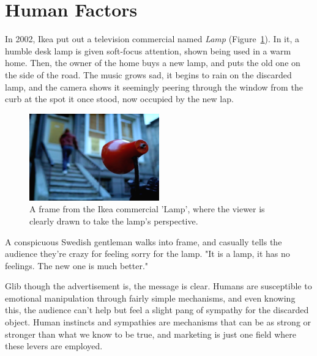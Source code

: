 \documentclass{sfuthesis}
\begin{document}









\section{Human Factors}

In 2002, Ikea put out a television commercial named \textit{Lamp} (Figure~\ref{fig:lamp}). In it, a humble desk lamp is given soft-focus attention, shown being used in a warm home. Then, the owner of the home buys a new lamp, and puts the old one on the side of the road. The music grows sad, it begins to rain on the discarded lamp, and the camera shows it seemingly peering through the window from the curb at the spot it once stood, now occupied by the new lap.

\begin{figure}
    \centering
    \includegraphics[width=0.5\textwidth]{ikea.png} 

    \caption{A frame from the Ikea commercial 'Lamp', where the viewer is clearly drawn to take the lamp's perspective.}
    \label{fig:lamp}
\end{figure}

A conspicuous Swedish gentleman walks into frame, and casually tells the audience they're crazy for feeling sorry for the lamp. "It is a lamp, it has no feelings. The new one is much better."

Glib though the advertisement is, the message is clear. Humans are susceptible to emotional manipulation through fairly simple mechanisms, and even knowing this, the audience can't help but feel a slight pang of sympathy for the discarded object. Human instincts and sympathies are mechanisms that can be as strong or stronger than what we know to be true, and marketing is just one field where these levers are employed.
\end{document}
